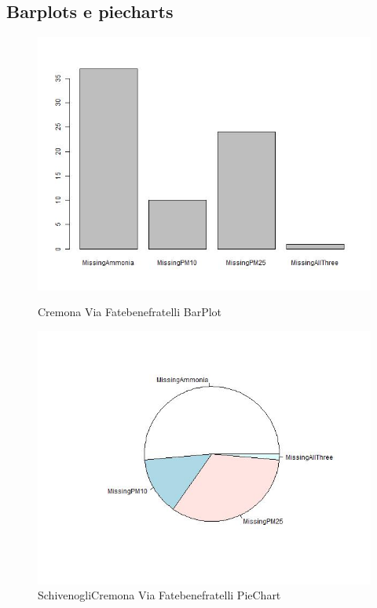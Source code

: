 \documentclass{article}
\begin{document}
\subsection{Barplots e piecharts}
\begin{figure}[H]
  \centering 
  \includegraphics[scale = 0.4]{Picture/Barplots e piecharts/Cremona Via Fatebenefratelli BarPlotMV.jpeg}
  \caption{Cremona Via Fatebenefratelli BarPlot}
  \centering
  \centering 
  \includegraphics[scale = 0.4]{Picture/Barplots e piecharts/Cremona Via Fatebenefratelli PieChartMV.jpeg}
  \caption{SchivenogliCremona Via Fatebenefratelli PieChart}
  \centering
\end{figure}
\end{document}
